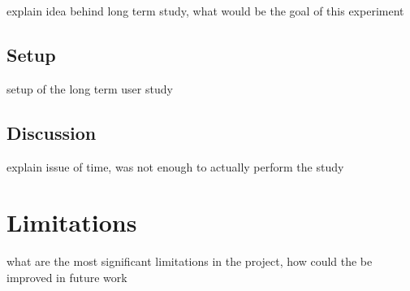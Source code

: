 explain idea behind long term study, what would be the goal of this experiment

\subsection{Setup}

setup of the long term user study

\subsection{Discussion}

explain issue of time, was not enough to actually perform the study

\section{Limitations}

what are the most significant limitations in the project, how could the be improved in future work